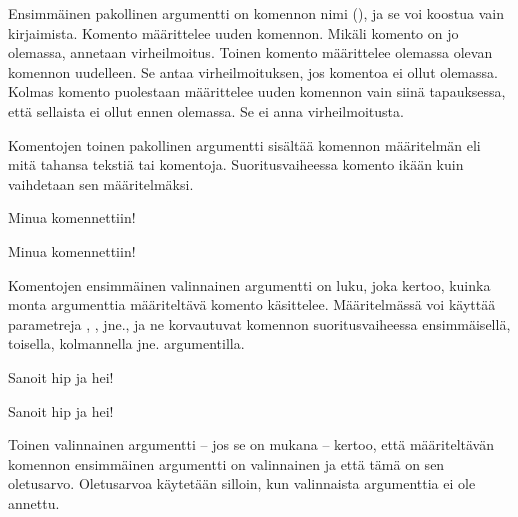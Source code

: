 \begin{koodilohkosis}
\newcommand     {\nimi}[n][oletus]{määritelmä}
\renewcommand   {\nimi}[n][oletus]{määritelmä}
\providecommand {\nimi}[n][oletus]{määritelmä}
\end{koodilohkosis}

\noindent
Ensimmäinen pakollinen argumentti on komennon nimi (), ja
se voi koostua vain kirjaimista. Komento 
määrittelee uuden komennon. Mikäli komento on jo olemassa, annetaan
virheilmoitus. Toinen komento  määrittelee
olemassa olevan komennon uudelleen. Se antaa virheilmoituksen, jos
komentoa ei ollut olemassa. Kolmas komento 
puolestaan määrittelee uuden komennon vain siinä tapauksessa, että
sellaista ei ollut ennen olemassa. Se ei anna virheilmoitusta.

Komentojen toinen pakollinen argumentti  sisältää
komennon määritelmän eli mitä tahansa tekstiä tai komentoja.
Suoritusvaiheessa komento ikään kuin vaihdetaan sen määritelmäksi.

\begin{koodilohkosis}
\newcommand{\komento}{Minua komennettiin!}
\komento
\end{koodilohkosis}

\begin{tulossis}
  Minua komennettiin!
\end{tulossis}

\noindent
Komentojen ensimmäinen valinnainen argumentti  on luku, joka
kertoo, kuinka monta argumenttia määriteltävä komento käsittelee.
Määritelmässä voi käyttää parametreja , ,
 jne., ja ne korvautuvat komennon suoritusvaiheessa
ensimmäisellä, toisella, kolmannella jne. argumentilla.

\begin{koodilohkosis}
\newcommand{\komento}[2]{Sanoit #1 ja #2!}
\komento{hip}{hei}
\end{koodilohkosis}

\begin{tulossis}
  Sanoit hip ja hei!
\end{tulossis}

\noindent
Toinen valinnainen argumentti  -- jos se on mukana --
kertoo, että määriteltävän komennon ensimmäinen argumentti on
valinnainen ja että tämä on sen oletusarvo. Oletusarvoa käytetään
silloin, kun valinnaista argumenttia ei ole annettu.

